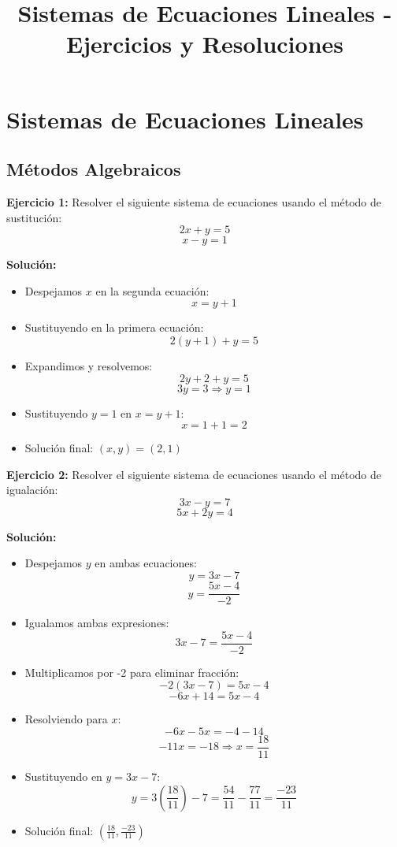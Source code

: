 \documentclass{profesor}
\title{Sistemas de Ecuaciones Lineales - Ejercicios y Resoluciones}
\begin{document}
\maketitle
\tableofcontents
\newpage

\section{Sistemas de Ecuaciones Lineales}

\subsection{Métodos Algebraicos}

\textbf{Ejercicio 1:}  
Resolver el siguiente sistema de ecuaciones usando el método de sustitución:  
\[
2x + y = 5
\]
\[
x - y = 1
\]

\textbf{Solución:}  
\begin{itemize}
    \item Despejamos \( x \) en la segunda ecuación:
    \[
    x = y + 1
    \]
    \item Sustituyendo en la primera ecuación:
    \[
    2(y+1) + y = 5
    \]
    \item Expandimos y resolvemos:
    \[
    2y + 2 + y = 5
    \]
    \[
    3y = 3 \Rightarrow y = 1
    \]
    \item Sustituyendo \( y = 1 \) en \( x = y + 1 \):
    \[
    x = 1 + 1 = 2
    \]
    \item Solución final: \( (x, y) = (2,1) \)
\end{itemize}

\textbf{Ejercicio 2:}  
Resolver el siguiente sistema de ecuaciones usando el método de igualación:  
\[
3x - y = 7
\]
\[
5x + 2y = 4
\]

\textbf{Solución:}  
\begin{itemize}
    \item Despejamos \( y \) en ambas ecuaciones:
    \[
    y = 3x - 7
    \]
    \[
    y = \frac{5x - 4}{-2}
    \]
    \item Igualamos ambas expresiones:
    \[
    3x - 7 = \frac{5x - 4}{-2}
    \]
    \item Multiplicamos por -2 para eliminar fracción:
    \[
    -2(3x - 7) = 5x - 4
    \]
    \[
    -6x + 14 = 5x - 4
    \]
    \item Resolviendo para \( x \):
    \[
    -6x - 5x = -4 - 14
    \]
    \[
    -11x = -18 \Rightarrow x = \frac{18}{11}
    \]
    \item Sustituyendo en \( y = 3x - 7 \):
    \[
    y = 3\left(\frac{18}{11}\right) - 7 = \frac{54}{11} - \frac{77}{11} = \frac{-23}{11}
    \]
    \item Solución final: \( \left(\frac{18}{11}, \frac{-23}{11}\right) \)
\end{itemize}
\end{document}
